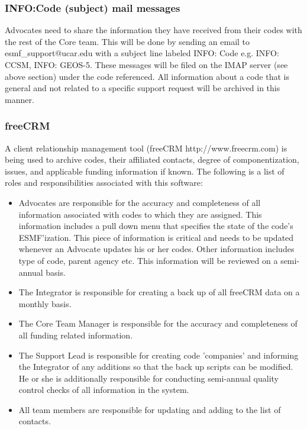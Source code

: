\subsubsection{INFO:Code (subject) mail messages}
\label{infomail}

Advocates need to share the information they have received from their codes with the rest 
of the Core team. This will be done by sending an email to esmf\_support@ucar.edu with a 
subject line labeled INFO: Code e.g. INFO: CCSM, INFO: GEOS-5. These messages will be 
filed on the IMAP server (see above section) under the code referenced. All information 
about a code that is general and not related to a specific support request will be archived 
in this manner. 

\subsubsection{freeCRM}
A client relationship management tool (freeCRM http://www.freecrm.com) is being used 
to archive codes, their affiliated contacts, degree of componentization, issues, and 
applicable funding information if known. The following is a list of roles and 
responsibilities associated with this software:
\begin{itemize}
\item Advocates are responsible for the accuracy and completeness of all information 
associated with codes to which they are assigned.  This information includes a pull 
down menu that specifies the state of the code's ESMF'ization. This piece of 
information is critical and needs to be updated whenever an Advocate updates his or 
her codes. Other information includes type of code, parent agency etc. This 
information will be reviewed on a semi-annual basis. 
\item The Integrator is responsible for creating a back up of all freeCRM data on a 
monthly basis.
\item The Core Team Manager is responsible for the accuracy and completeness of all 
funding related information.
\item The Support Lead is responsible for creating code 'companies' and informing 
the Integrator of any additions so that the back up scripts can be modified. He or 
she is additionally responsible for conducting semi-annual quality control checks of 
all information in the system. 
\item All team members are responsible for updating and adding to the list of 
contacts. 
\end{itemize} 

